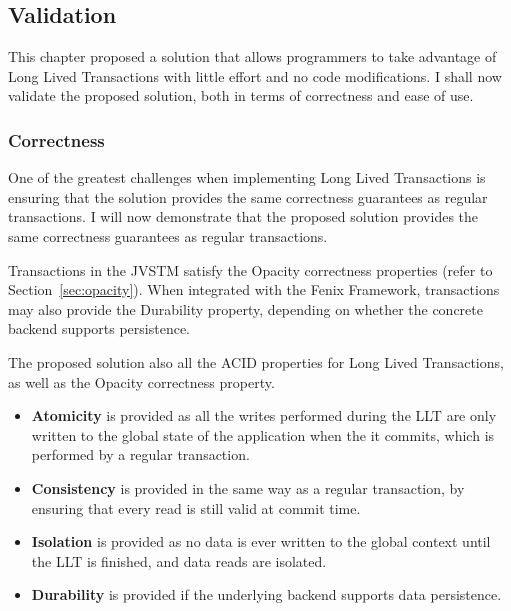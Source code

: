 \documentclass{llncs}
\begin{document}
\subsection{Validation}
\label{sec:validation}

This chapter proposed a solution that allows programmers to take
advantage of Long Lived Transactions with little effort and no code
modifications. I shall now validate the proposed solution, both in
terms of correctness and ease of use.

\subsubsection{Correctness}

One of the greatest challenges when implementing Long Lived Transactions
is ensuring that the solution provides the same correctness guarantees
as regular transactions. I will now demonstrate that the proposed
solution provides the same correctness guarantees as regular transactions.

Transactions in the JVSTM satisfy the Opacity correctness properties
(refer to Section~\ref{sec:opacity}). When integrated with the Fenix
Framework, transactions may also provide the Durability property,
depending on whether the concrete backend supports persistence.

The proposed solution also all the ACID properties for Long
Lived Transactions, as well as the Opacity correctness property.

\begin{itemize}

\item {\bf Atomicity} is provided as all the writes performed during
  the LLT are only written to the global state of the application when
  the it commits, which is performed by a regular transaction.

\item {\bf Consistency} is provided in the same way as a regular
  transaction, by ensuring that every read is still valid at commit
  time.

\item {\bf Isolation} is provided as no data is ever written to the
  global context until the LLT is finished, and data reads are isolated.

\item {\bf Durability} is provided if the underlying backend supports
  data persistence.

\end{itemize}
\end{document}
